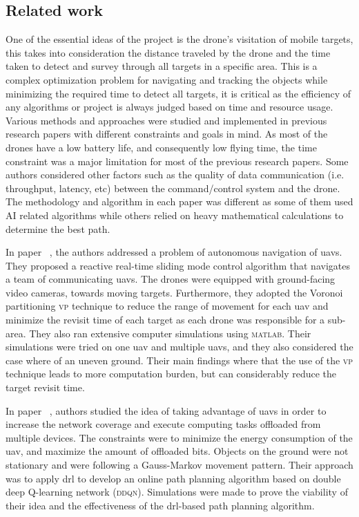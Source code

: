 \documentclass[../main.tex]{subfiles}
\begin{document}
\blindtext

\subsection{Related work}



		One of the essential ideas of the project is the drone's visitation of mobile 
		targets, this takes into consideration the distance traveled by the drone and the time taken to detect and survey through all targets in a specific area.
		This is a complex optimization problem for navigating and tracking the objects while minimizing the required time to detect all targets,
		it is critical as the efficiency of any algorithms 
		or project is always judged based on time and resource usage.
		Various methods and approaches were studied and implemented 
		in previous research papers with different constraints and 
		goals in mind.
		As most of the drones have a low battery life, 
		and consequently low flying time, the time constraint was a major limitation 
		for most of the previous research papers. 
		Some authors considered other factors such as the quality 
		of data communication (i.e. throughput, latency, etc) between the command/control 
		system and the drone.
		The methodology and algorithm in each paper was different 
		as some of them used AI related algorithms while others relied 
		on heavy mathematical calculations to determine the best path.
		
		In paper ~\cite{hua20}, the authors \citeauthor{hua20} 
		addressed a problem of autonomous navigation of \glspl{uav}. 
		They proposed a reactive real-time sliding mode control algorithm 
		that navigates a team of communicating \glspl{uav}.
		The drones were equipped with ground-facing video cameras,
		towards moving targets. 
		Furthermore, they adopted the Voronoi partitioning \textsc{vp} technique 
		to reduce the range of movement for each \gls{uav} and 
		minimize the revisit time of each target as each drone was responsible 
		for a sub-area.
		They also ran extensive computer simulations using \textsc{matlab}. 
		Their simulations were tried on one \gls{uav} and multiple \glspl{uav},
		and they also considered the case where of an uneven ground. 
		Their main findings where that the use of the \textsc{vp} technique 
		leads to more computation burden, but can considerably reduce the target 
		revisit time.
		
		
		In paper ~\cite{pen21}, authors \citeauthor{pen21} studied the idea 
		of taking advantage of \glspl{uav} in order to increase the network
		 coverage and execute computing tasks offloaded from multiple devices. 
		The constraints were to minimize the energy consumption of the \gls{uav}, 
		and maximize the amount of offloaded bits. 
		Objects on the ground were not stationary and were following a Gauss-Markov 
		movement pattern. Their approach was to apply \gls{drl} to develop an online path planning algorithm based on double deep Q-learning network (\textsc{ddqn}).
		Simulations were made to prove the viability of their idea and the 
		effectiveness of the \gls{drl}-based path planning algorithm.
		
\end{document}
